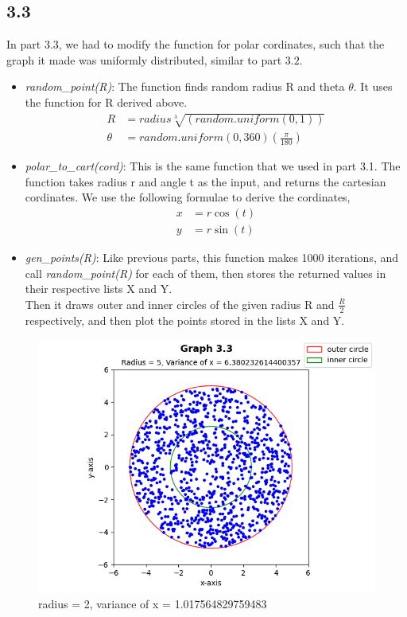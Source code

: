 \documentclass[answers]{exam}
\begin{document}
\subsection*{3.3}
\begin{framed}
  \indent In part $3.3$, we had to modify the function for polar cordinates, such that the graph it made was uniformly distributed, similar to part $3.2$.

  \begin{itemize}
    \item \emph{random\_point(R)}: The function finds random radius R and theta $\theta$. It uses the function for R derived above. 
      \begin{align*}
        R &= radius\sqrt[3]{(random.uniform(0,1))}\\
        \theta &= random.uniform(0,360)(\frac{\pi}{180})
      \end{align*}
    \item \emph{polar\_to\_cart(cord)}: This is the same function that we used in part 3.1. The function takes radius r and angle t as the input, and returns the cartesian cordinates. We use the following formulae to derive the cordinates,\\
      \begin{align*}
        x &= r\cos(t)\\
        y &= r\sin(t)
      \end{align*}
    \item \emph{gen\_points(R)}: Like previous parts, this function makes 1000 iterations, and call \emph{random\_point(R)} for each of them, then stores the returned values in their respective lists X and Y.\\
      Then it draws outer and inner circles of the given radius R and $\frac{R}{2}$ respectively, and then plot the points stored in the lists X and Y.
  \end{itemize}
\end{framed}


\begin{figure}[h]
  \caption{radius = 2, variance of x = 1.017564829759483}
  \centering
  \includegraphics[scale=0.7]{Q3/Q3(3).png}
\end{figure}
\end{document}

